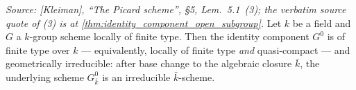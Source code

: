 \begin{theorem}

  \label{thm:identity_component_finite_type_geom_irreducible}

  \textit{Source: [Kleiman], ``The Picard scheme'', \S 5,
  Lem.~5.1~(3); the verbatim source quote of (3) is at
  \cref{thm:identity_component_open_subgroup}.}
  Let \(k\) be a field and \(G\) a \(k\)-group scheme locally of finite
  type. Then the identity component \(G^0\) is of finite type over
  \(k\) --- equivalently, locally of finite type \emph{and}
  quasi-compact --- and geometrically irreducible: after base change
  to the algebraic closure \(\bar k\), the underlying scheme
  \(G^0_{\bar k}\) is an irreducible \(\bar k\)-scheme.
\end{theorem}

